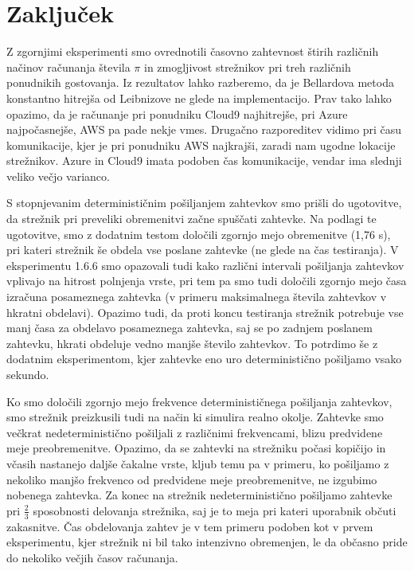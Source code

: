 \section{Zaključek}

Z zgornjimi eksperimenti smo ovrednotili časovno zahtevnost štirih različnih načinov računanja števila \(\pi\) in zmogljivost strežnikov pri treh različnih ponudnikih gostovanja.
Iz rezultatov lahko razberemo, da je Bellardova metoda konstantno hitrejša od Leibnizove ne glede na implementacijo.
Prav tako lahko opazimo, da je računanje pri ponudniku Cloud9 najhitrejše, pri Azure najpočasnejše, AWS pa pade nekje vmes.
Drugačno razporeditev vidimo pri času komunikacije, kjer je pri ponudniku AWS najkrajši, zaradi nam ugodne lokacije strežnikov.
Azure in Cloud9 imata podoben čas komunikacije, vendar ima slednji veliko večjo varianco.

S stopnjevanim determinističnim pošiljanjem zahtevkov smo prišli do ugotovitve, da strežnik pri preveliki obremenitvi začne spuščati zahtevke. Na podlagi te ugotovitve, smo z dodatnim testom določili zgornjo mejo obremenitve (1,76 s), pri kateri strežnik še obdela vse poslane zahtevke (ne glede na čas testiranja).
V eksperimentu 1.6.6 smo opazovali tudi kako različni intervali pošiljanja zahtevkov vplivajo na hitrost polnjenja vrste, pri tem pa smo tudi določili zgornjo mejo časa izračuna posameznega zahtevka (v primeru maksimalnega števila zahtevkov v hkratni obdelavi).
Opazimo tudi, da proti koncu testiranja strežnik potrebuje vse manj časa za obdelavo posameznega zahtevka, saj se po zadnjem poslanem zahtevku, hkrati obdeluje vedno manjše število zahtevkov.
To potrdimo še z dodatnim eksperimentom, kjer zahtevke eno uro deterministično pošiljamo vsako sekundo.

Ko smo določili zgornjo mejo frekvence determinističnega pošiljanja zahtevkov, smo strežnik preizkusili tudi na način ki simulira realno okolje.
Zahtevke smo večkrat nedeterministično pošiljali z različnimi frekvencami, blizu predvidene meje preobremenitve.
Opazimo, da se zahtevki na strežniku počasi kopičijo in včasih nastanejo daljše čakalne vrste, kljub temu pa v primeru, ko pošiljamo z nekoliko manjšo frekvenco od predvidene meje preobremenitve, ne izgubimo nobenega zahtevka.
Za konec na strežnik nedeterministično pošiljamo zahtevke pri \(\frac{2}{3}\) sposobnosti delovanja strežnika, saj je to meja pri kateri uporabnik občuti zakasnitve.
Čas obdelovanja zahtev je v tem primeru podoben kot v prvem eksperimentu, kjer strežnik ni bil tako intenzivno obremenjen, le da občasno pride do nekoliko večjih časov računanja.

